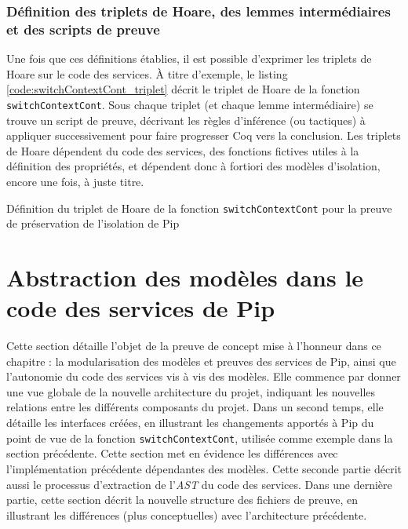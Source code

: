 			\subsubsection{Définition des triplets de Hoare, des lemmes intermédiaires et des scripts de preuve}

			Une fois que ces définitions établies, il est possible d'exprimer les triplets de Hoare sur le code des services. À titre d'exemple, le listing \ref{code:switchContextCont_triplet} décrit le triplet de Hoare de la fonction \texttt{switchContextCont}. Sous chaque triplet (et chaque lemme intermédiaire) se trouve un script de preuve, décrivant les règles d'inférence (ou tactiques) à appliquer successivement pour faire progresser Coq vers la conclusion. Les triplets de Hoare dépendent du code des services, des fonctions fictives utiles à la définition des propriétés, et dépendent donc à fortiori des modèles d'isolation, encore une fois, à juste titre.
			\begin{listing}[!ht]
				\caption{Définition du triplet de Hoare de la fonction \texttt{switchContextCont} pour la preuve de préservation de l'isolation de Pip}
				\label{code:switchContextCont_triplet}
			\end{listing}

		
	\section{Abstraction des modèles dans le code des services de Pip}

	Cette section détaille l'objet de la preuve de concept mise à l'honneur dans ce chapitre : la modularisation des modèles et preuves des services de Pip, ainsi que l'autonomie du code des services vis à vis des modèles. Elle commence par donner une vue globale de la nouvelle architecture du projet, indiquant les nouvelles relations entre les différents composants du projet. Dans un second temps, elle détaille les interfaces créées, en illustrant les changements apportés à Pip du point de vue de la fonction \texttt{switchContextCont}, utilisée comme exemple dans la section précédente. Cette section met en évidence les différences avec l'implémentation précédente dépendantes des modèles. Cette seconde partie décrit aussi le processus d'extraction de l'\emph{AST} du code des services. Dans une dernière partie, cette section décrit la nouvelle structure des fichiers de preuve, en illustrant les différences (plus conceptuelles) avec l'architecture précédente.
		
